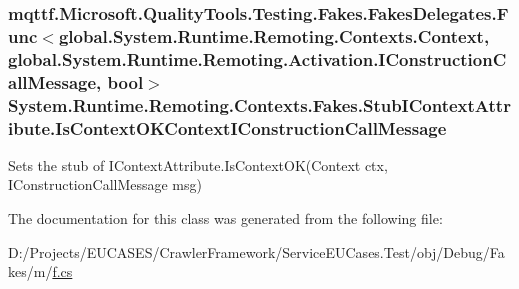 \hypertarget{class_system_1_1_runtime_1_1_remoting_1_1_contexts_1_1_fakes_1_1_stub_i_context_attribute_aa4fbc6dd76d77c5a2588d9c7199bbd35}{
\subsubsection[{Is\-Context\-O\-K\-Context\-I\-Construction\-Call\-Message}]{\setlength{\rightskip}{0pt plus 5cm}mqttf.\-Microsoft.\-Quality\-Tools.\-Testing.\-Fakes.\-Fakes\-Delegates.\-Func$<$global.\-System.\-Runtime.\-Remoting.\-Contexts.\-Context, global.\-System.\-Runtime.\-Remoting.\-Activation.\-I\-Construction\-Call\-Message, bool$>$ System.\-Runtime.\-Remoting.\-Contexts.\-Fakes.\-Stub\-I\-Context\-Attribute.\-Is\-Context\-O\-K\-Context\-I\-Construction\-Call\-Message}}\label{class_system_1_1_runtime_1_1_remoting_1_1_contexts_1_1_fakes_1_1_stub_i_context_attribute_aa4fbc6dd76d77c5a2588d9c7199bbd35}


Sets the stub of I\-Context\-Attribute.\-Is\-Context\-O\-K(\-Context ctx, I\-Construction\-Call\-Message msg)



The documentation for this class was generated from the following file\-:\begin{DoxyCompactItemize}
\item 
D\-:/\-Projects/\-E\-U\-C\-A\-S\-E\-S/\-Crawler\-Framework/\-Service\-E\-U\-Cases.\-Test/obj/\-Debug/\-Fakes/m/\hyperlink{m_2f_8cs}{f.\-cs}\end{DoxyCompactItemize}
